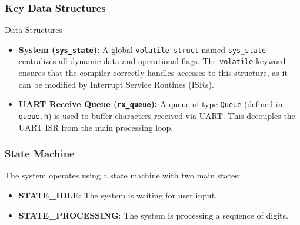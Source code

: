 \documentclass[12pt,a4paper]{article}
\begin{document}
\subsubsection{Key Data Structures}

\begin{mytitledbox}{Data Structures}
\begin{itemize}[label=\textcolor{myblue}{$\circ$}, itemsep=1.5mm]
    \item \textbf{System (\texttt{sys\_state}):} A global \texttt{volatile struct} named \texttt{sys\_state} centralizes all dynamic data and operational flags. The \texttt{volatile} keyword ensures that the compiler correctly handles accesses to this structure, as it can be modified by Interrupt Service Routines (ISRs).

    \item \textbf{UART Receive Queue (\texttt{rx\_queue}):} A queue of type \texttt{Queue} (defined in \texttt{queue.h}) is used to buffer characters received via UART. This decouples the UART ISR from the main processing loop.
\end{itemize}
\end{mytitledbox}

\vspace{2mm}

\subsubsection{State Machine}
The system operates using a state machine with two main states:

\begin{tcolorbox}[mybox]
\begin{itemize}[label=\textcolor{myblue}{$\blacktriangleright$}, itemsep=1.5mm]
    \item \textbf{STATE\_IDLE}: The system is waiting for user input.
    \item \textbf{STATE\_PROCESSING}: The system is processing a sequence of digits.
\end{itemize}
\end{tcolorbox}

\vspace{2mm}

\begin{center}
\end{center}
\end{document}
